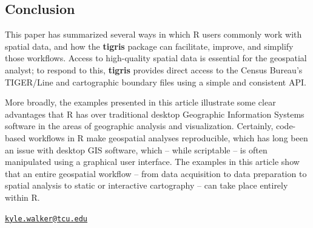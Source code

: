 \subsection{Conclusion}\label{conclusion}

This paper has summarized several ways in which R users commonly work
with spatial data, and how the \textbf{tigris} package can facilitate,
improve, and simplify those workflows. Access to high-quality spatial
data is essential for the geospatial analyst; to respond to this,
\textbf{tigris} provides direct access to the Census Bureau's TIGER/Line
and cartographic boundary files using a simple and consistent API.

More broadly, the examples presented in this article illustrate some
clear advantages that R has over traditional desktop Geographic
Information Systems software in the areas of geographic analysis and
visualization. Certainly, code-based workflows in R make geospatial
analyses reproducible, which has long been an issue with desktop GIS
software, which -- while scriptable -- is often manipulated using a
graphical user interface. The examples in this article show that an
entire geospatial workflow -- from data acquisition to data preparation
to spatial analysis to static or interactive cartography -- can take
place entirely within R.



\address{%
Kyle Walker\\
Texas Christian University\\
2850 S University Dr\\ Fort Worth, TX 76109\\
}
\href{mailto:kyle.walker@tcu.edu}{\nolinkurl{kyle.walker@tcu.edu}}

\address{%
Bob Rudis\\
\\
\\ \\
}


